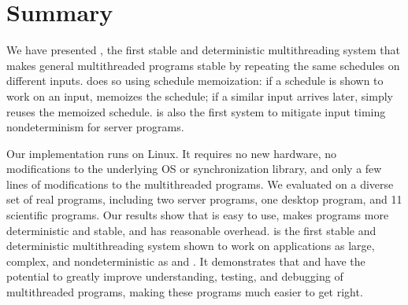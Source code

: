 \section{Summary}
\label{sec:tern-summary}

We have presented \tern, the first stable and deterministic multithreading 
system that makes general
multithreaded programs stable by repeating the same schedules on different
inputs.  \tern does so using schedule memoization: if a schedule is shown
to work on an input, \tern memoizes the schedule; if a similar input
arrives later, \tern simply reuses the memoized schedule. \tern is also the
first \dmt system to mitigate input timing nondeterminism for server
programs.

Our \tern implementation runs on Linux.  It requires no new hardware, no
modifications to the underlying OS or synchronization library, and only a
few lines of modifications to the multithreaded programs.  We evaluated
\tern on a diverse set of real programs, including two server programs, one
desktop program, and 11 scientific programs.  Our results show that
\tern is easy to use, makes programs more deterministic and stable, and has
reasonable overhead.  \tern is the first stable and deterministic 
multithreading system shown to work on applications as large, complex, and 
nondeterministic as \mysql and \apache.
It demonstrates that \smt and \dmt have the potential to greatly improve
understanding, testing, and debugging of multithreaded programs, making these
programs much easier to get right.

